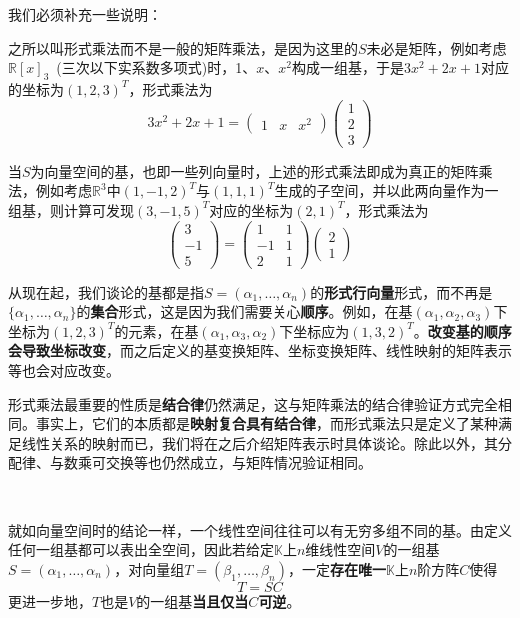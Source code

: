 \documentclass[a4paper,UTF8,fontset=windows,AutoFakeBold]{ctexart}
\begin{document}
我们必须补充一些说明：
\begin{compactitem}
    \item 之所以叫形式乘法而不是一般的矩阵乘法，是因为这里的$S$未必是矩阵，例如考虑$\mathbb{R}[x]_3$\ (三次以下实系数多项式)时，1、$x$、$x^2$构成一组基，于是$3x^2+2x+1$对应的坐标为$(1,2,3)^T$，形式乘法为
    $$3x^2+2x+1=\begin{pmatrix}1&x&x^2\end{pmatrix}\begin{pmatrix}1\\2\\3\end{pmatrix}$$
    \item 当$S$为向量空间的基，也即一些列向量时，上述的形式乘法即成为真正的矩阵乘法，例如考虑$\mathbb{R}^3$中$(1,-1,2)^T$与$(1,1,1)^T$生成的子空间，并以此两向量作为一组基，则计算可发现$(3,-1,5)^T$对应的坐标为$(2,1)^T$，形式乘法为
    $$\begin{pmatrix}3\\-1\\5\end{pmatrix}=\begin{pmatrix}1&1\\-1&1\\2&1\end{pmatrix}\begin{pmatrix}2\\1\end{pmatrix}$$
    \item 从现在起，我们谈论的基都是指$S=(\alpha_1,\dots,\alpha_n)$的\textbf{形式行向量}形式，而不再是$\{\alpha_1,\dots,\alpha_n\}$的\textbf{集合}形式，这是因为我们需要关心\textbf{顺序}。例如，在基$(\alpha_1,\alpha_2,\alpha_3)$下坐标为$(1,2,3)^T$的元素，在基$(\alpha_1,\alpha_3,\alpha_2)$下坐标应为$(1,3,2)^T$。\textbf{改变基的顺序会导致坐标改变}，而之后定义的基变换矩阵、坐标变换矩阵、线性映射的矩阵表示等也会对应改变。
    \item 形式乘法最重要的性质是\textbf{结合律}仍然满足，这与矩阵乘法的结合律验证方式完全相同。事实上，它们的本质都是\textbf{映射复合具有结合律}，而形式乘法只是定义了某种满足线性关系的映射而已，我们将在之后介绍矩阵表示时具体谈论。除此以外，其分配律、与数乘可交换等也仍然成立，与矩阵情况验证相同。
\end{compactitem}

\

就如向量空间时的结论一样，一个线性空间往往可以有无穷多组不同的基。由定义任何一组基都可以表出全空间，因此若给定$\mathbb{K}$上$n$维线性空间$V$的一组基$S=(\alpha_1,\dots,\alpha_n)$，对向量组$T=(\beta_1,\dots,\beta_n)$，一定\textbf{存在唯一}$\mathbb{K}$上$n$阶方阵$C$使得
$$T=SC$$
更进一步地，$T$也是$V$的一组基\textbf{当且仅当$C$可逆}。
\end{document}
